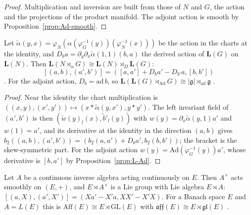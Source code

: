 \begin{proof}
  \leanok
  Multiplication and inversion are built from those of $N$ and $G$, the action and the
  projections of the product manifold. The adjoint action is smooth by
  Proposition~\ref{prop:Ad-smooth}.
\end{proof}

\begin{proposition}
  \label{prop:semidirect-lie}
  \leanok
  Let $\tilde\alpha(y, x) = \varphi_N(\alpha(\varphi_G^{-1}(y))(\varphi_N^{-1}(x)))$ be the action
  in the charts at the identity, and $D_b a = \partial_y \partial_x \tilde\alpha(1, 1)(b, a)$ the
  derived action of $\mathbf{L}(G)$ on $\mathbf{L}(N)$. Then
  $\mathbf{L}(N \rtimes_\alpha G) \cong \mathbf{L}(N) \rtimes_D \mathbf{L}(G)$:
  \[
    [(a, b), (a', b')] = ([a, a'] + D_b a' - D_{b'} a, [b, b'])
  \]
  \cite[Proposition 5.2.8]{GN26}. For the adjoint action, $D_b = \mathrm{ad}\, b$, so
  $\mathbf{L}(\mathbf{L}(G) \rtimes_{\mathrm{Ad}} G) \cong |\mathfrak g| \rtimes_{\mathrm{ad}}
  \mathfrak g$ \cite[Example 5.2.12]{GN26}.
\end{proposition}

\begin{proof}
  \leanok
  Near the identity the chart multiplication is
  $((x, y), (x', y')) \mapsto (x * \tilde\alpha(y, x'), y * y')$. The left invariant field of
  $(a', b')$ is then $(\tilde{w}(y)_l(x), \tilde{b}'_l(y))$ with
  $w(y) = \partial_x \tilde\alpha(y, 1) a'$ and $w(1) = a'$, and its derivative at the identity
  in the direction $(a, b)$ gives
  $b_2((a, b), (a', b')) = (b_2(a, a') + D_b a', b_2(b, b'))$; the bracket is the skew-symmetric
  part. For the adjoint action $w(y) = \mathrm{Ad}(\varphi_G^{-1}(y)) a'$, whose derivative is
  $[b, a']$ by Proposition~\ref{prop:L-Ad}.
\end{proof}

\begin{example}
  \label{ex:affine}
  \leanok
  Let $A$ be a continuous inverse algebra acting continuously on $E$. Then $A^\times$ acts smoothly
  on $(E, +)$, and $E \rtimes A^\times$ is a Lie group with Lie algebra $E \rtimes A$:
  $[(a, X), (a', X')] = (Xa' - X'a, XX' - X'X)$. For a Banach space $E$ and $A = L(E)$ this is
  $\mathrm{Aff}(E) \cong E \rtimes \mathrm{GL}(E)$ with
  $\mathfrak{aff}(E) \cong E \rtimes \mathfrak{gl}(E)$ \cite[Example 5.2.9]{GN26}.
\end{example}

